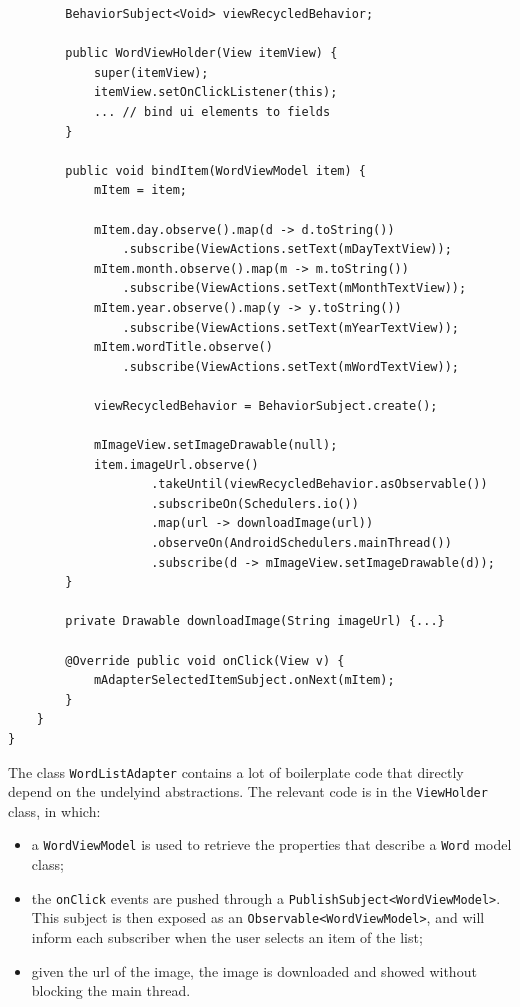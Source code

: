 \begin{verbatim}
        BehaviorSubject<Void> viewRecycledBehavior;

        public WordViewHolder(View itemView) {
            super(itemView);
            itemView.setOnClickListener(this);
            ... // bind ui elements to fields
        }

        public void bindItem(WordViewModel item) {
            mItem = item;

            mItem.day.observe().map(d -> d.toString())
                .subscribe(ViewActions.setText(mDayTextView));
            mItem.month.observe().map(m -> m.toString())
                .subscribe(ViewActions.setText(mMonthTextView));
            mItem.year.observe().map(y -> y.toString())
                .subscribe(ViewActions.setText(mYearTextView));
            mItem.wordTitle.observe()
                .subscribe(ViewActions.setText(mWordTextView));

            viewRecycledBehavior = BehaviorSubject.create();

            mImageView.setImageDrawable(null);
            item.imageUrl.observe()
                    .takeUntil(viewRecycledBehavior.asObservable())
                    .subscribeOn(Schedulers.io())
                    .map(url -> downloadImage(url))
                    .observeOn(AndroidSchedulers.mainThread())
                    .subscribe(d -> mImageView.setImageDrawable(d));
        }

        private Drawable downloadImage(String imageUrl) {...}

        @Override public void onClick(View v) {
            mAdapterSelectedItemSubject.onNext(mItem);
        }
    }
}
\end{verbatim}

The class \texttt{WordListAdapter} contains a lot of boilerplate code
that directly depend on the undelyind abstractions. The relevant code is
in the \texttt{ViewHolder} class, in which:

\begin{itemize}
\itemsep1pt\parskip0pt
\item
  a \texttt{WordViewModel} is used to retrieve the properties that
  describe a \texttt{Word} model class;
\item
  the \texttt{onClick} events are pushed through a
  \texttt{PublishSubject\textless{}WordViewModel\textgreater{}}. This
  subject is then exposed as an
  \texttt{Observable\textless{}WordViewModel\textgreater{}}, and will
  inform each subscriber when the user selects an item of the list;
\item
  given the url of the image, the image is downloaded and showed without
  blocking the main thread.
\end{itemize}


